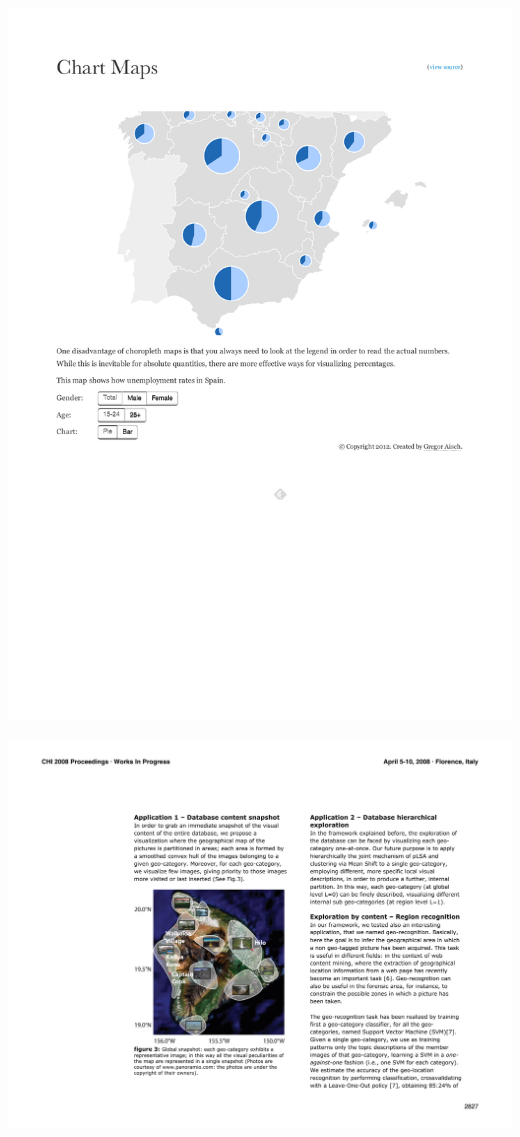 \begin{itemize}
{    
    \label{fig:did-map-barchart}
}


\parbox [h]{0.4\textwidth }{
    \includegraphics [width=\linewidth]{figures/dia_map_piechart.pdf}
    \label{fig:did-map-piechart}
}
\hfill
\hspace{0.5cm}
\parbox [h]{0.4\textwidth }{
    \includegraphics [width=\linewidth]{figures/dia_map_hull.pdf}
    \label{fig:did-map-hull}
}


\end{itemize}










